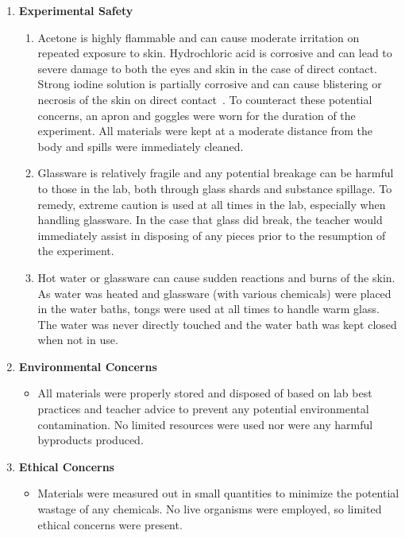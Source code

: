 \begin{enumerate}[label=(\alph*)]
	\item \textbf{Experimental Safety}
		\begin{enumerate}[label=(\roman*)]
			\item Acetone is highly flammable and can cause moderate irritation on repeated exposure to skin. Hydrochloric acid is corrosive and can lead to severe damage to both the eyes and skin in the case of direct contact. Strong iodine solution is partially corrosive and can cause blistering or necrosis of the skin on direct contact~\parencite{acetone, acid, iodoacetone}. To counteract these potential concerns, an apron and goggles were worn for the duration of the experiment. All materials were kept at a moderate distance from the body and spills were immediately cleaned.
			\item Glassware is relatively fragile and any potential breakage can be harmful to those in the lab, both through glass shards and substance spillage. To remedy, extreme caution is used at all times in the lab, especially when handling glassware. In the case that glass did break, the teacher would immediately assist in disposing of any pieces prior to the resumption of the experiment. 
			\item Hot water or glassware can cause sudden reactions and burns of the skin. As water was heated and glassware (with various chemicals) were placed in the water baths, tongs were used at all times to handle warm glass. The water was never directly touched and the water bath was kept closed when not in use.
		\end{enumerate}
	\item \textbf{Environmental Concerns}
	\begin{itemize}[label={}]
	  \item All materials were properly stored and disposed of based on lab best practices and teacher advice to prevent any potential environmental contamination. No limited resources were used nor were any harmful byproducts produced.
	\end{itemize}
	\item \textbf{Ethical Concerns}
	\begin{itemize}[label={}]
	  \item Materials were measured out in small quantities to minimize the potential wastage of any chemicals. No live organisms were employed, so limited ethical concerns were present.
	\end{itemize}
\end{enumerate}

